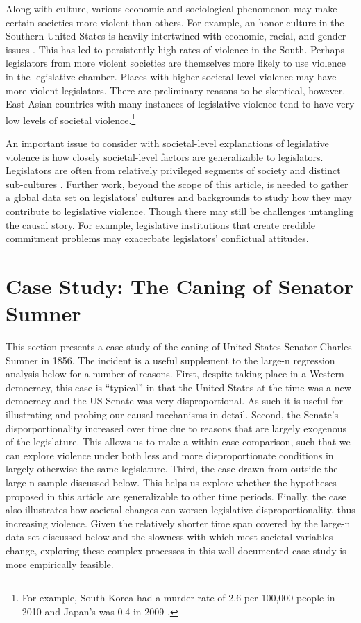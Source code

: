 \documentclass[a4paper]{article}\usepackage[]{graphicx}\usepackage[]{color}
\begin{document}
Along with culture, various economic and sociological phenomenon may make certain societies more violent than others. For example, an honor culture in the Southern United States is heavily intertwined with economic, racial, and gender issues \citep[]{nisbett1996culture}. This has led to persistently high rates of violence in the South. Perhaps legislators from more violent societies are themselves more likely to use violence in the legislative chamber. Places with higher societal-level violence may have more violent legislators. There are preliminary reasons to be skeptical, however. East Asian countries with many instances of legislative violence tend to have very low levels of societal violence.\footnote{For example, South Korea had a murder rate of 2.6 per 100,000 people in 2010 and Japan's was 0.4 in 2009 \cite{UNMurder2013}.}

An important issue to consider with societal-level explanations of legislative violence is how closely societal-level factors are generalizable to legislators. Legislators are often from relatively privileged segments of society and distinct sub-cultures \citep[408]{Spary2013}. Further work, beyond the scope of this article, is needed to gather a global data set on legislators' cultures and backgrounds to study how they may contribute to legislative violence. Though there may still be challenges untangling the causal story. For example, legislative institutions that create credible commitment problems may exacerbate legislators' conflictual attitudes.

\section*{Case Study: The Caning of Senator Sumner}

This section presents a case study of the caning of United States Senator Charles Sumner in 1856. The incident is a useful supplement to the large-n regression analysis below for a number of reasons. First, despite taking place in a Western democracy, this case is ``typical'' \citep[299]{Seawright2008} in that the United States at the time was a new democracy and the US Senate was very disproportional. As such it is useful for illustrating and probing our causal mechanisms in detail. Second, the Senate's disporportionality increased over time due to reasons that are largely exogenous of the legislature. This allows us to make a within-case comparison, such that we can explore violence under both less and more disproportionate conditions in largely otherwise the same legislature. Third, the case drawn from outside the large-n sample discussed below. This helps us explore whether the hypotheses proposed in this article are generalizable to other time periods. Finally, the case also illustrates how societal changes can worsen legislative disproportionality, thus increasing violence. Given the relatively shorter time span covered by the large-n data set discussed below and the slowness with which most societal variables change, exploring these complex processes in this well-documented case study is more empirically feasible.
\end{document}
